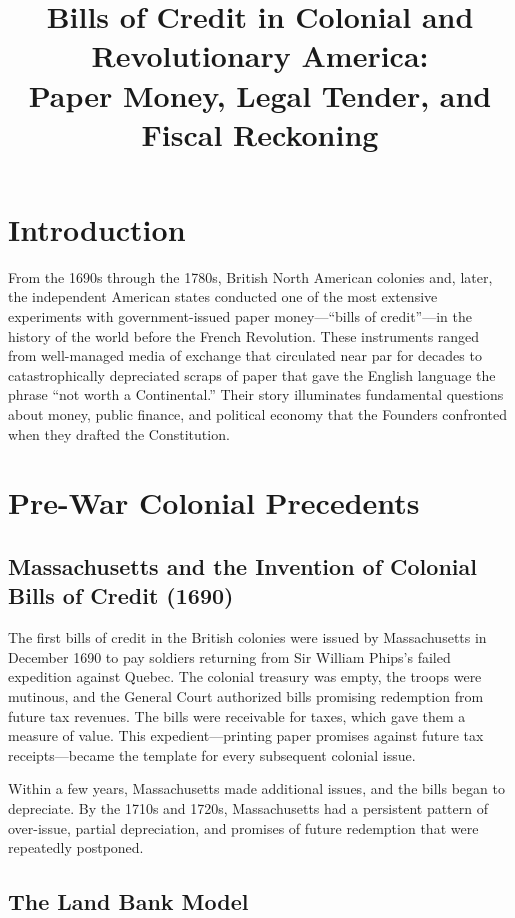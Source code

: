 \documentclass[12pt]{article}
\title{Bills of Credit in Colonial and Revolutionary America:\\
Paper Money, Legal Tender, and Fiscal Reckoning}
\author{}
\date{}
\begin{document}
\maketitle

\tableofcontents
\newpage

\section{Introduction}

From the 1690s through the 1780s, British North American colonies and, later,
the independent American states conducted one of the most extensive experiments
with government-issued paper money---``bills of credit''---in the history of the
world before the French Revolution.  These instruments  ranged from
well-managed media of exchange that circulated near par for decades to
catastrophically depreciated scraps of paper that gave the English language the
phrase ``not worth a Continental.''  Their story illuminates fundamental
questions about money, public finance, and political economy that the Founders
confronted when they drafted the Constitution.

\section{Pre-War Colonial Precedents}

\subsection{Massachusetts and the Invention of Colonial Bills of Credit (1690)}

The first bills of credit in the British colonies were issued by Massachusetts
in December 1690 to pay soldiers returning from Sir William Phips's failed
expedition against Quebec.  The colonial treasury was empty, the troops were
mutinous, and the General Court authorized bills promising redemption from
future tax revenues.  The bills were receivable for taxes, which gave them a
measure of value.  This expedient---printing paper promises against future tax
receipts---became the template for every subsequent colonial issue.

Within a few years, Massachusetts made additional issues, and the bills began to
depreciate.  By the 1710s and 1720s, Massachusetts had a persistent pattern of
over-issue, partial depreciation, and promises of future redemption that were
repeatedly postponed.

\subsection{The Land Bank Model}
\end{document}

